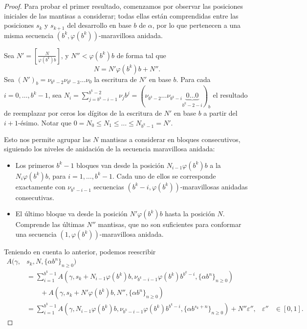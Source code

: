 \begin{proof}
Para probar el primer resultado,
comenzamos por observar las posiciones iniciales de las mantisas a considerar;
todas ellas están comprendidas entre las posiciones $s_k$ y $s_{k+1}$ del
desarrollo en base $b$ de $\alpha$, por lo que pertenecen a una misma
secuencia $(b^k, \varphi(b^k))$-maravillosa anidada.

Sea $N' = \left[ \frac{N}{\varphi(b^k)b} \right]$, y $N'' < \varphi(b^k)b$ de
forma tal que 
\[ N = N'\varphi(b^k)b + N''. \]
Sea $(N')_b = \nu_{b^k-2}\nu_{b^k-3}\dots\nu_0$
la escritura de $N'$ en base $b$. Para cada $i = 0, \dots, b^k-1$, sea
$N_i = \sum_{j=b^k-i-1}^{b^k-2} \nu_{j}b^{j}
= (\nu_{b^k-2}\dots\nu_{b^k-i}\underbrace{0\dots0}_{b^k-2-i})_b$
el resultado de reemplazar por ceros los dígitos de la
escritura de $N'$ en base $b$ a partir del $i+1$-ésimo.
Notar que $0 = N_0 \leq N_1 \leq \dots \leq N_{b^k-1} = N'$.

Esto nos permite agrupar las $N$ mantisas a considerar en bloques consecutivos,
siguiendo los niveles de anidación de la secuencia maravillosa anidada:
\begin{itemize}
	\item Los primeros $b^k - 1$ bloques van desde la posición
		$N_{i-1}\varphi(b^k)b$ a la $N_{i}\varphi(b^k)b$,
		para $i = 1, \dots, b^k - 1$. Cada uno de ellos se corresponde
		exactamente con $\nu_{b^k-i-1}$ secuencias
		$(b^k - i, \varphi(b^k))$-maravillosas anidadas consecutivas.
	\item El último bloque va desde la posición $N'\varphi(b^k)b$ hasta la
		posición $N$. Comprende las últimas $N''$ mantisas, que no son suficientes
		para conformar una secuencia $(1, \varphi(b^k))$-maravillosa anidada.
\end{itemize}

Teniendo en cuenta lo anterior, podemos reescribir
\begin{align*}
	A(\gamma, &s_k, N, \lbrace \alpha b^{n} \rbrace_{n\geq0}) \\
	&= \sum_{i=1}^{b^k-1} A\left(\gamma, s_k + N_{i-1}\varphi(b^k)b, \nu_{b^k-i-1}
		\varphi(b^k)b^{b^k-i}, \lbrace \alpha b^{n} \rbrace_{n\geq0} \right) \\
	& \qquad + A\left(\gamma, s_k + N' \varphi(b^k)b, N'',
		\lbrace \alpha b^{n} \rbrace_{n\geq0} \right) \\
	&= \sum_{i=1}^{b^k-1} A\left(\gamma, N_{i-1}\varphi(b^k)b,
		\nu_{b^k-i-1}\varphi(b^k)b^{b^k-i}, \lbrace \alpha b^{s_k+n}
		\rbrace_{n\geq0} \right) + N''\varepsilon'', & \varepsilon'' &\in [0, 1].
\end{align*}


\end{proof}
